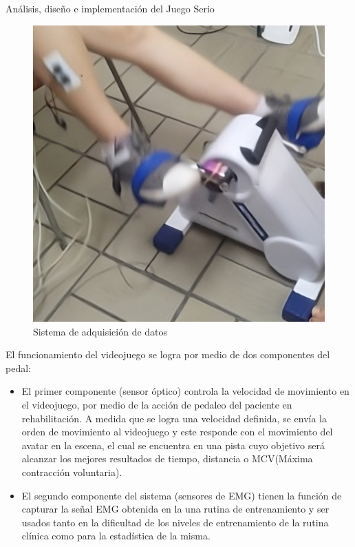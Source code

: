 \begin{thesischapter}{2} {Análisis, diseño e implementación del Juego Serio}
    \begin{figure}[ht]
        \centering
        \includegraphics[scale=0.2]{images/sa.png}
        \caption{Sistema de adquisición de datos}
        \label{fig: sa}
    \end{figure}    

    \vspace{10pt} %
    El funcionamiento del videojuego se logra por medio de dos componentes del pedal:
    \begin{itemize}
        \item El primer componente (sensor óptico) controla la velocidad de movimiento en el videojuego, por
        medio de la acción de pedaleo del paciente en rehabilitación. A medida
        que se logra una velocidad definida, se envía la orden de movimiento al videojuego y 
        este responde con el movimiento del avatar en la escena, el cual se encuentra en una pista 
        cuyo objetivo será alcanzar los mejores resultados de tiempo, distancia o  MCV(Máxima contracción voluntaria).
        \item El segundo componente del sistema (sensores de EMG) tienen la función de capturar la señal EMG obtenida en la 
        una rutina de entrenamiento y ser usados tanto en la dificultad de los niveles de entrenamiento de la rutina clínica como para la 
        estadística de la misma.
    \end{itemize}
    

\end{thesischapter}
